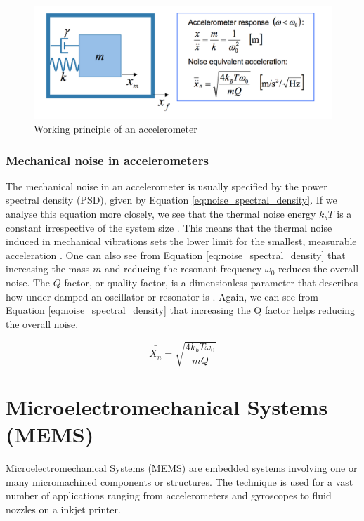 \begin{figure}[h]
\centering
\includegraphics[scale=0.5]{fig/accelerometer_working_principle.png}
\caption{Working principle of an accelerometer \cite[~p.34]{kaajakari09}}
\label{fig:accel_working_principle}
\end{figure}

\subsubsection{Mechanical noise in accelerometers}
\label{sec:mechanical_noise}
The mechanical noise in an accelerometer is usually specified by the power spectral density (PSD), given by Equation \ref{eq:noise_spectral_density}. If we analyse this equation more closely, we see that the thermal noise energy $k_b T$ is a constant irrespective of the system size \cite[~p.13]{kaajakari09}. This means that the thermal noise induced in mechanical vibrations sets the lower limit for the smallest, measurable acceleration \cite[~p.41]{kaajakari09}. One can also see from Equation \ref{eq:noise_spectral_density} that increasing the mass $m$ and reducing the resonant frequency $\omega_0$ reduces the overall noise. The $Q$ factor, or quality factor, is a dimensionless parameter that describes how under-damped an oscillator or resonator is \cite[~p.216]{harlow04}. Again, we can see from Equation \ref{eq:noise_spectral_density} that increasing the Q factor helps reducing the overall noise.

\begin{equation}
\bar{\ddot{X_n}} = \sqrt{\frac{4 k_b T \omega_0}{mQ}}
\label{eq:noise_spectral_density}
\end{equation}

\section{Microelectromechanical Systems (MEMS)}

Microelectromechanical Systems (MEMS) are embedded systems involving one or many micromachined components or structures\cite[p.~3]{maluf04}. The technique is used for a vast number of applications ranging from accelerometers and gyroscopes to fluid nozzles on a inkjet printer.

